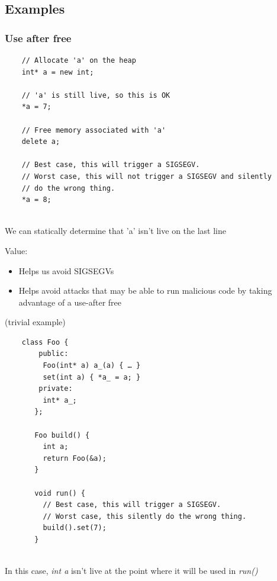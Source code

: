 \documentclass{article}
\begin{document}
\subsection{Examples}

\subsubsection{Use after free}

\begin{verbatim}
    // Allocate 'a' on the heap
    int* a = new int;
    
    // 'a' is still live, so this is OK
    *a = 7;
    
    // Free memory associated with 'a'
    delete a;
    
    // Best case, this will trigger a SIGSEGV.
    // Worst case, this will not trigger a SIGSEGV and silently
    // do the wrong thing.
    *a = 8;
    
\end{verbatim}

We can statically determine that 'a' isn't live on the last line

Value:
\begin{itemize}
    \item Helps us avoid SIGSEGVs
    \item Helps avoid attacks that may be able to run malicious code by taking advantage of a use-after free 
\end{itemize}

(trivial example)

\hrulefill

\begin{verbatim}
    class Foo {
        public:
         Foo(int* a) a_(a) { … }
         set(int a) { *a_ = a; }
        private:
         int* a_;
       };
       
       Foo build() {
         int a;
         return Foo(&a);
       }
       
       void run() {
         // Best case, this will trigger a SIGSEGV.
         // Worst case, this silently do the wrong thing.
         build().set(7);
       }
       
\end{verbatim}

In this case, \textit{int a} isn't live at the point where it will be used in \textit{run()}

\vspace*{1em}
\end{document}
